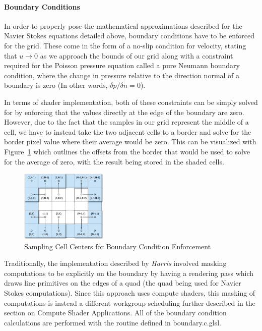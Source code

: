 \documentclass[conference]{IEEEtran}
\begin{document}
\paragraph{Boundary Conditions} In order to properly pose the mathematical approximations described for the Navier Stokes equations detailed above, boundary conditions have to be enforced for the grid. These come in the form of a no-slip condition for velocity, stating that $u \to 0$ as we approach the bounds of our grid along with a constraint required for the Poisson pressure equation called a pure Neumann boundary condition, where the change in pressure relative to the direction normal of a boundary is zero (In other words, $\delta p / \delta n = 0$). 

In terms of shader implementation, both of these constraints can be simply solved for by enforcing that the values directly at the edge of the boundary are zero. However, due to the fact that the samples in our grid represent the middle of a cell, we have to instead take the two adjacent cells to a border and solve for the border pixel value where their average would be zero. This can be visualized with Figure~\ref{boundaryconditions} which outlines the offsets from the border that would be used to solve for the average of zero, with the result being stored in the shaded cells.

\begin{figure}[htbp]
\centerline{\includegraphics[width=0.37\textwidth]{boundaries.jpg}}
\caption{Sampling Cell Centers for Boundary Condition Enforcement\cite{navierstokes}}
\label{boundaryconditions}
\end{figure}

Traditionally, the implementation described by \textit{Harris} involved masking computations to be explicitly on the boundary by having a rendering pass which draws line primitives on the edges of a quad (the quad being used for Navier Stokes computations). Since this approach uses compute shaders, this masking of computations is instead a different workgroup scheduling further described in the section on Compute Shader Applications. All of the boundary condition calculations are performed with the routine defined in boundary.c.glsl.
\end{document}
